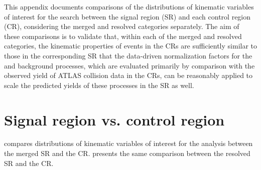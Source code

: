\label{chapter:appendix_SR_CR_distributions}

This appendix documents comparisons of the distributions of kinematic variables of interest for the search between the signal region (SR) and each control region (CR), considering the merged and resolved categories separately. The aim of these comparisons is to validate that, within each of the merged and resolved categories, the kinematic properties of events in the CRs are sufficiently similar to those in the corresponding SR that the data-driven normalization factors for the \wjets and \ttbar background processes, which are evaluated primarily by comparison with the observed yield of ATLAS collision data in the CRs, can be reasonably applied to scale the predicted yields of these processes in the SR as well. 

\section{Signal region vs. \wjets control region}
\label{app:appendix_SR_CR_distributions_wjets}

\Fig{~\ref{fig:N_1_CRW_merged}} compares distributions of kinematic variables of interest for the analysis between the merged SR and the \wjets CR. \Fig{~\ref{fig:N_1_CRW_resolved}} presents the same comparison between the resolved SR and the \wjets CR.

